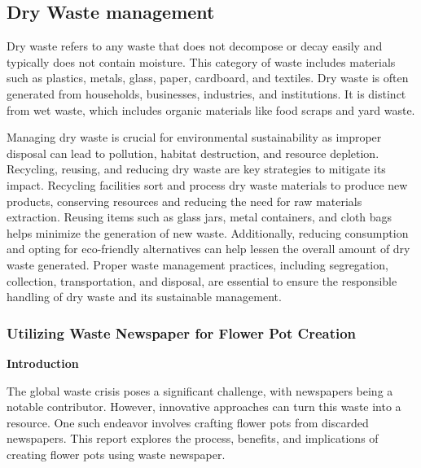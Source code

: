 \documentclass[12pt]{article}
\newcommand{\img}[2]{\scalebox{#1}{\texttt{[image: \#2]}}}
\begin{document}
	\subsection{Dry Waste management}
	\par Dry waste refers to any waste that does not decompose or decay easily and typically does not contain moisture. This category of waste includes materials such as plastics, metals, glass, paper, cardboard, and textiles. Dry waste is often generated from households, businesses, industries, and institutions. It is distinct from wet waste, which includes organic materials like food scraps and yard waste. \\

	\par Managing dry waste is crucial for environmental sustainability as improper disposal can lead to pollution, habitat destruction, and resource depletion. Recycling, reusing, and reducing dry waste are key strategies to mitigate its impact. Recycling facilities sort and process dry waste materials to produce new products, conserving resources and reducing the need for raw materials extraction. Reusing items such as glass jars, metal containers, and cloth bags helps minimize the generation of new waste. Additionally, reducing consumption and opting for eco-friendly alternatives can help lessen the overall amount of dry waste generated. Proper waste management practices, including segregation, collection, transportation, and disposal, are essential to ensure the responsible handling of dry waste and its sustainable management.  \newpage

	\subsubsection{Utilizing Waste Newspaper for Flower Pot Creation}
	\begin{center}
		\img{.35}{Waste/Table.jpg}
	\end{center}
	\textbf{Introduction} \\
	\par The global waste crisis poses a significant challenge, with newspapers being a notable contributor. However, innovative approaches can turn this waste into a resource. One such endeavor involves crafting flower pots from discarded newspapers. This report explores the process, benefits, and implications of creating flower pots using waste newspaper. \\
\end{document}
